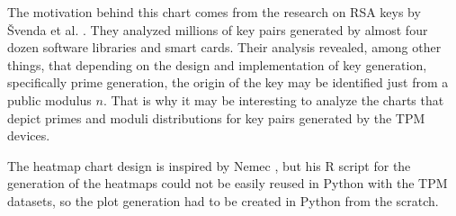 The motivation behind this chart comes from the research on RSA keys by Švenda et al. \cite{svenda-1mrsa_usenix2016}. They analyzed millions of key pairs generated by almost four dozen software libraries and smart cards. Their analysis revealed, among other things, that depending on the design and implementation of key generation, specifically prime generation, the origin of the key may be identified just from a public modulus $n$. That is why it may be interesting to analyze the charts that depict primes and moduli distributions for key pairs generated by the TPM devices.

The heatmap chart design is inspired by Nemec \cite{Nemec2016thesis}, but his R script for the generation of the heatmaps could not be easily reused in Python with the TPM datasets, so the plot generation had to be created in Python from the scratch.

